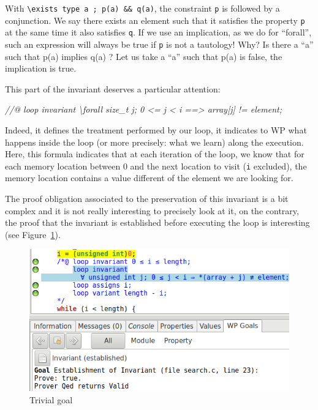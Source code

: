\documentclass[12pt,francais,]{scrbook}
\newenvironment{Shaded}{}{}
\newcommand{\CommentTok}[1]{\textcolor[rgb]{0.38,0.63,0.69}{\textit{{#1}}}}
\begin{document}
With \texttt{\textbackslash{}exists\ type\ a\ ;\ p(a)\ \&\&\ q(a)}, the
constraint \texttt{p} is followed by a conjunction. We say there exists
an element such that it satisfies the property \texttt{p} at the same
time it also satisfies \texttt{q}. If we use an implication, as we do
for ``forall'', such an expression will always be true if \texttt{p} is
not a tautology! Why? Is there a ``a'' such that p(a) implies q(a) ? Let
us take a ``a'' such that p(a) is false, the implication is true.

This part of the invariant deserves a particular attention:

\begin{footnotesize}\begin{Shaded}
\begin{Highlighting}[]
\CommentTok{//@ loop invariant \textbackslash{}forall size_t j; 0 <= j < i ==> array[j] != element;}
\end{Highlighting}
\end{Shaded}\end{footnotesize}

Indeed, it defines the treatment performed by our loop, it indicates to
WP what happens inside the loop (or more precisely: what we learn) along
the execution. Here, this formula indicates that at each iteration of
the loop, we know that for each memory location between 0 and the next
location to visit (\texttt{i} excluded), the memory location contains a
value different of the element we are looking for.

The proof obligation associated to the preservation of this invariant is
a bit complex and it is not really interesting to precisely look at it,
on the contrary, the proof that the invariant is established before
executing the loop is interesting (see Figure~\ref{fig:3-4-trivial}).

\begin{figure}[htbp]
\centering
\includegraphics[scale=0.5]{3-4-trivial-establishment.png}
\caption{Trivial goal}
\label{fig:3-4-trivial}
\end{figure}
\end{document}
